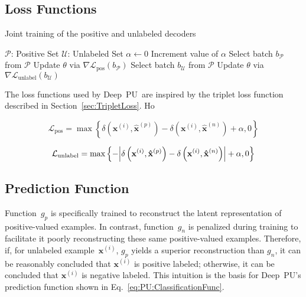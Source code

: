 \documentclass[10pt]{article}
\DeclarePairedDelimiter{\abs}{\lvert}{\rvert}
\newcommand{\toolname}{Deep~PU}
\newcommand{\xI}[1]{\mathbf{x}^{(#1)}}
\newcommand{\xPred}[1]{\mathbf{\hat{x}}^{\left(#1\right)}}
\newcommand{\xP}{\xPred{p}}
\newcommand{\xN}{\xPred{n}}
\newcommand{\puDist}[2]{\delta\left(#1, #2\right)}
\newcommand{\puDistDiff}{\puDist{\xI{i}}{\xP} - \puDist{\xI{i}}{\xN}}
\newcommand{\pLoss}{\mathcal{L}_{\text{pos}}}
\newcommand{\uLoss}{\mathcal{L}_{\text{unlabel}}}
\begin{document}
\subsection{Loss Functions}

\begin{algorithm}[t]
  \caption{Joint training of the positive and unlabeled decoders}\label{alg:}
  \begin{algorithmic}[1]
    \State $\mathcal{P}$: Positive Set
    \State $\mathcal{U}$: Unlabeled Set
    \State $\alpha\gets 0$
      \State Increment value of $\alpha$
        \State Select batch $b_{\mathcal{P}}$ from $\mathcal{P}$
        \State Update $\theta$ via $\nabla\pLoss(b_{\mathcal{P}})$
        \State Select batch $b_{\mathcal{U}}$ from $\mathcal{P}$
        \State Update $\theta$ via $\nabla\uLoss(b_{\mathcal{U}})$
      \EndWhile
    \EndWhile
  \end{algorithmic}
\end{algorithm}

The loss functions used by \toolname\ are inspired by the triplet loss function described in Section~\ref{sec:TripletLoss}.  Ho

  \begin{equation}\label{eq:PU:PosLoss}
    \pLoss = \max\left\{ \puDistDiff + \alpha, 0 \right\}
  \end{equation}

  \begin{equation}\label{eq:PU:UnlabelLoss}
    \uLoss = \max\left\{ - \abs*{\puDistDiff} + \alpha, 0 \right\}
  \end{equation}

\subsection{Prediction Function}

Function~$g_{p}$ is specifically trained to reconstruct the latent representation of positive-valued examples.  In contrast, function~$g_{n}$ is penalized during training to facilitate it poorly reconstructing these same positive-valued examples.  Therefore, if, for unlabeled example~$\xI{i}$, $g_{p}$ yields a superior reconstruction than $g_{n}$, it can be reasonably concluded that $\xI{i}$ is positive labeled; otherwise, it can be concluded that $\xI{i}$ is negative labeled.  This intuition is the basis for \toolname's prediction function shown in Eq.~\eqref{eq:PU:ClassificationFunc}.
\end{document}
